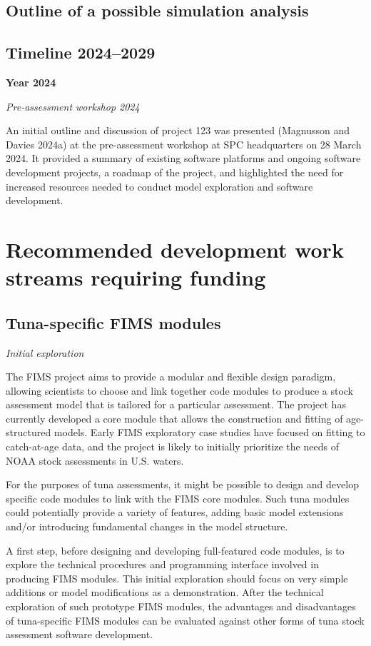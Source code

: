 \documentclass{SCreport}
\begin{document}
\subsection{Outline of a possible simulation analysis}

\subsection{Timeline 2024--2029}

\textbf{Year 2024}

\textit{Pre-assessment workshop 2024}

An initial outline and discussion of project 123 was presented (Magnusson and
Davies 2024a) at the pre-assessment workshop at SPC headquarters on 28 March
2024. It provided a summary of existing software platforms and ongoing software
development projects, a roadmap of the project, and highlighted the need for
increased resources needed to conduct model exploration and software
development.

\section{Recommended development work streams requiring funding}

\subsection{Tuna-specific FIMS modules}
\label{sec:tuna-fims}

\textit{Initial exploration}

The FIMS project aims to provide a modular and flexible design paradigm,
allowing scientists to choose and link together code modules to produce a stock
assessment model that is tailored for a particular assessment. The project has
currently developed a core module that allows the construction and fitting of
age-structured models. Early FIMS exploratory case studies have focused on
fitting to catch-at-age data, and the project is likely to initially prioritize
the needs of NOAA stock assessments in U.S. waters.

For the purposes of tuna assessments, it might be possible to design and develop
specific code modules to link with the FIMS core modules. Such tuna modules
could potentially provide a variety of features, adding basic model extensions
and/or introducing fundamental changes in the model structure.

A first step, before designing and developing full-featured code modules, is to
explore the technical procedures and programming interface involved in producing
FIMS modules. This initial exploration should focus on very simple additions or
model modifications as a demonstration. After the technical exploration of such
prototype FIMS modules, the advantages and disadvantages of tuna-specific FIMS
modules can be evaluated against other forms of tuna stock assessment software
development.
\end{document}
